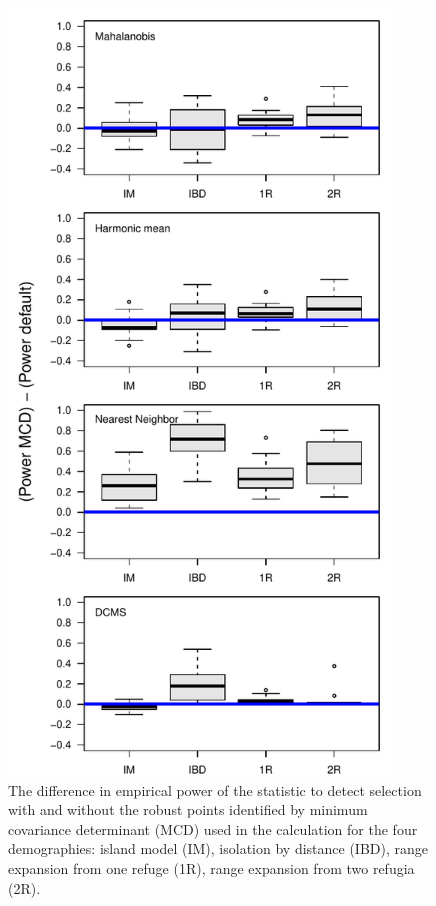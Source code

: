 \documentclass[12pt, oneside]{amsart}
\begin{document}
\newpage
\begin{figure}[h]
\begin{center}
\includegraphics[width=4in]{../figures_man2/S4-LandsharcComparePowerMCDminusPowerDefaultByDemog.pdf}
\end{center}
\caption[]{The difference in empirical power of the statistic to detect selection with and without the robust points identified by minimum covariance determinant (MCD) used in the calculation for the four demographies: island model (IM), isolation by distance (IBD), range expansion from one refuge (1R), range expansion from two refugia (2R). } 
 \label{fig:???}
\end{figure}
\end{document}

